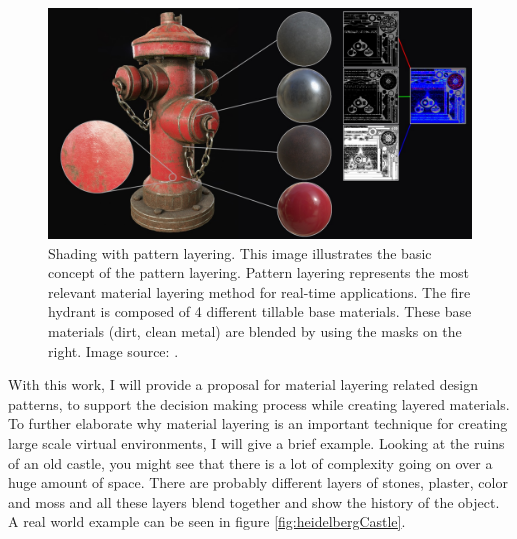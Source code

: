  
\begin{figure}
	\centering
	\includegraphics[width=0.7\linewidth]{images/01cha_01_dynamicMatBlend.jpg}
	\caption{Shading with pattern layering. This image illustrates the basic concept of the pattern layering. Pattern layering represents the most relevant material layering method for real-time applications. The fire hydrant is composed of 4 different tillable base materials. These base materials (dirt, clean metal) are blended by using the masks on the right. Image source: \cite{noguer2016layerHydrant}.}
	\label{fig:dynamicMaterialBlending}
\end{figure}



With this work, I will provide a proposal for material layering related design patterns, to support the decision making process while creating layered materials. To further elaborate why material layering is an important technique for creating large scale virtual environments, I will give a brief example. Looking at the ruins of an old castle, you might see that there is a lot of complexity going on over a huge amount of space. There are probably different layers of stones, plaster, color and moss and all these layers blend together and show the history of the object. A real world example can be seen in figure \ref{fig:heidelbergCastle}.

